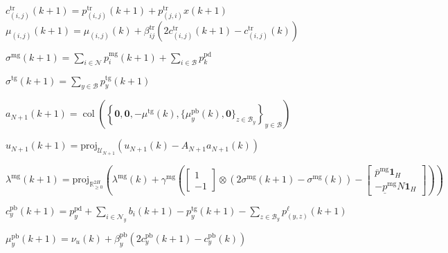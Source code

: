 \documentclass[10pt]{article}
\newcommand{\mc}{\mathcal}
\newcommand{\bb}{\mathbb}
\newcommand{\R}{\bb R}
\newcommand{\proj}{\mathrm{proj}}
\newcommand{\col}{\operatorname{col}}
\newcommand{\0}{\mathbf{0}}
\newcommand{\1}{\mathbf{1}}
\begin{document}
\begin{algorithm}[H]
\begin{algorithmic}[1]
\EndProcedure


\ForAll{ $ j \in \mc N_i$}
\State
$c^{\text{tr}}_{(i,j)}(k+1)  =  p^{\textrm{tr}}_{(i,j)} (k+1) + p^{\textrm{tr}}_{(j,i)}x(k+1)$
\State
$\mu_{(i,j)}(k+1) = \mu_{(i,j)}(k) + \beta_{ij}^{\text{tr}} \left( 
	2  c^{\text{tr}}_{(i,j)}(k+1) - c^{\text{tr}}_{(i,j)}(k)
	\right)$
\EndFor
\EndProcedure
\EndFor

\Statex
{}



\State
$ \sigma^{\text{mg}}(k+1) = \sum_{i \in \mc N} p_i^{\text{mg}}(k+1) + \sum_{i \in \mc B} p^{\text{pd}}_{k}$

\State
$\sigma^{\text{tg}}(k+1) = \sum_{y \in \mc B} p_y^{\text{tg}}(k+1)$
\EndProcedure

\State
$a_{N+1}(k+1) = \col \left( 
	\left\{
	\0,\0,-\mu^{\text{tg}}(k), 
	\{ \mu_y^{\text{pb}}(k), \0 \}_{z \in \mc B_y}
	\right\}_{y \in \mc B}
	\right)$

\State 	$u_{N+1}(k+1) = \proj_{\mc U_{N+1}}  \left( u_{N+1}(k) - A_{N+1} a_{N+1}(k) \right)$
\EndProcedure

\State
$\lambda^{\text{mg}}(k+1) = \textstyle
	\proj_{\R^{2 H}_{\geq 0}}\left( 
	\lambda^{\text{mg}}(k) + \gamma^{\text{mg}} \left( 
	\left[
	\begin{smallmatrix}
	1\\
	- 1 
	\end{smallmatrix}
	\right] \otimes (2 \sigma^{\text{mg}}(k+1)- \sigma^{\text{mg}}(k)) 
	-
	\left[
	\begin{smallmatrix}
	\overline{p}^{\mathrm{mg}}\1_{H} \\
	-     \underline{p}^{\mathrm{mg}}N \1_{H}
	\end{smallmatrix} 
	\right]  
	\right)
	\right)$
\EndProcedure
	
\ForAll{bus $ y \in \mc B$}

\State
$c^{\text{pb}}_y(k+1)   = p_y^{\text{pd}} + \sum_{i \in \mc N_y} b_i(k+1)- p^{\text{tg}}_y(k+1) - \sum_{z \in \mc B_y} p^\ell_{(y,z)} (k+1)$

\State
$\mu_y^{\text{pb}}(k+1) = \nu_u(k) + \beta^{\text{pb}}_y (2 c^{\text{pb}}_y(k+1)- c^{\text{pb}}_y(k))$
\EndFor
\EndProcedure	
	

\end{algorithmic}
\end{algorithm}
\end{document}
